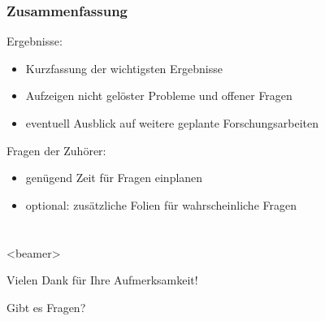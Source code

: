 \documentclass[aspectratio=3218]{beamer}
\begin{document}
\begin{frame}
	\frametitle<presentation>{Zusammenfassung}
	\begin{block}{Ergebnisse:}
	  \begin{itemize}
	  	\item Kurzfassung der wichtigsten Ergebnisse
	  	\item Aufzeigen nicht gelöster Probleme und offener Fragen
	  	\item eventuell Ausblick auf weitere geplante Forschungsarbeiten
		\end{itemize}
	\end{block}
	\begin{block}{Fragen der Zuhörer:}
	 \begin{itemize}
	 	\item genügend Zeit für Fragen einplanen
	 	\item optional: zusätzliche Folien für wahrscheinliche Fragen
	 \end{itemize}
	\end{block}	
\end{frame}

\section*{}

\begin{frame}<beamer>{}
	\begin{center}
		Vielen Dank für Ihre Aufmerksamkeit!
	\end{center}
	\begin{center}
		Gibt es Fragen?
	\end{center}
\end{frame}
\end{document}

